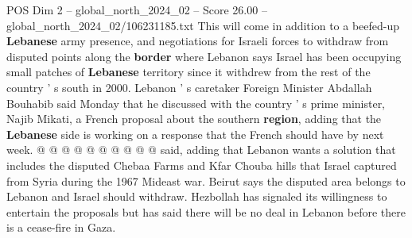 \begin{textsample}{POS Dim 2 – global\_north\_2024\_02 – Score 26.00 – global\_north\_2024\_02/106231185.txt}
This will come in addition to a beefed-up \textbf{Lebanese} army presence, and negotiations for Israeli forces to withdraw from disputed points along the \textbf{border} where Lebanon says Israel has been occupying small patches of \textbf{Lebanese} territory since it withdrew from the rest of the country ' s south in 2000.
Lebanon ' s caretaker Foreign Minister Abdallah Bouhabib said Monday that he discussed with the country ' s prime minister, Najib Mikati, a French proposal about the southern \textbf{region}, adding that the \textbf{Lebanese} side is working on a response that the French should have by next week. @ @ @ @ @ @ @ @ @ @ said, adding that Lebanon wants a solution that includes the disputed Chebaa Farms and Kfar Chouba hills that Israel captured from Syria during the 1967 Mideast war.
Beirut says the disputed area belongs to Lebanon and Israel should withdraw.
Hezbollah has signaled its willingness to entertain the proposals but has said there will be no deal in Lebanon before there is a cease-fire in Gaza.

\end{textsample}
